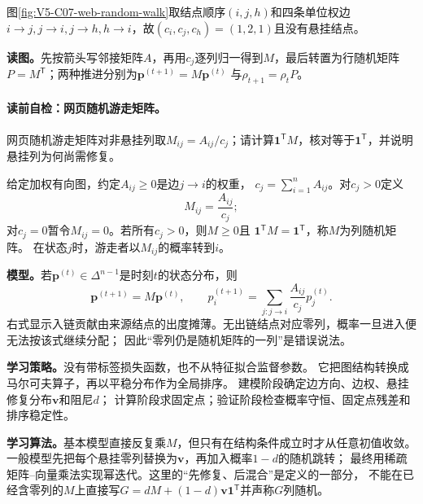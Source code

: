 图\ref{fig:V5-C07-web-random-walk}取结点顺序$(i,j,h)$和四条单位权边
$i\to j,j\to i,j\to h,h\to i$，故$(c_i,c_j,c_h)=(1,2,1)$且没有悬挂结点。


\textbf{读图。}先按箭头写邻接矩阵$A$，再用$c_j$逐列归一得到$M$，最后转置为行随机矩阵
$P=M^{\mathsf T}$；两种推进分别为$\boldsymbol p^{(t+1)}=M\boldsymbol p^{(t)}$
与$\rho_{t+1}=\rho_tP$。

\label{struct:V5-C07-CH07}
\paragraph{读前自检：网页随机游走矩阵。}网页随机游走矩阵对非悬挂列取$M_{ij}=A_{ij}/c_j$；请计算$\boldsymbol1^{\mathsf T}M$，核对等于$\boldsymbol1^{\mathsf T}$，并说明悬挂列为何尚需修复。\par

\begin{definition}[网页随机游走矩阵]\label{def:V5-C07-transition}
给定加权有向图，约定$A_{ij}\ge0$是边$j\to i$的权重，
$c_j=\sum_{i=1}^nA_{ij}$。对$c_j>0$定义
\[
M_{ij}=\frac{A_{ij}}{c_j};
\]
对$c_j=0$暂令$M_{ij}=0$。若所有$c_j>0$，则$M\ge0$且
$\boldsymbol1^{\mathsf T}M=\boldsymbol1^{\mathsf T}$，称$M$为列随机矩阵。
在状态$j$时，游走者以$M_{ij}$的概率转到$i$。
\end{definition}

\label{struct:V5-C07-CH08}
\textbf{模型。}若$\boldsymbol p^{(t)}\in\Delta^{n-1}$是时刻$t$的状态分布，则
\begin{equation}
\boldsymbol p^{(t+1)}=M\boldsymbol p^{(t)},\qquad
p_i^{(t+1)}=\sum_{j:j\to i}\frac{A_{ij}}{c_j}p_j^{(t)}.
\label{eq:V5-C07-random-walk}
\end{equation}
右式显示入链贡献由来源结点的出度摊薄。无出链结点对应零列，概率一旦进入便无法按该式继续分配；
因此“零列仍是随机矩阵的一列”是错误说法。

\label{struct:V5-C07-CH09}
\textbf{学习策略。}\PageRank{}没有带标签损失函数，也不从特征拟合监督参数。
它把图结构转换成马尔可夫算子，再以平稳分布作为全局排序。
建模阶段确定边方向、边权、悬挂修复分布$\boldsymbol v$和阻尼$d$；
计算阶段求固定点；验证阶段检查概率守恒、固定点残差和排序稳定性。

\label{struct:V5-C07-CH10}
\textbf{学习算法。}基本模型直接反复乘$M$，但只有在结构条件成立时才从任意初值收敛。
一般模型先把每个悬挂零列替换为$\boldsymbol v$，再加入概率$1-d$的随机跳转；
最终用稀疏矩阵--向量乘法实现幂迭代。这里的“先修复、后混合”是定义的一部分，
不能在已经含零列的$M$上直接写$G=dM+(1-d)\boldsymbol v\boldsymbol1^{\mathsf T}$并声称$G$列随机。

